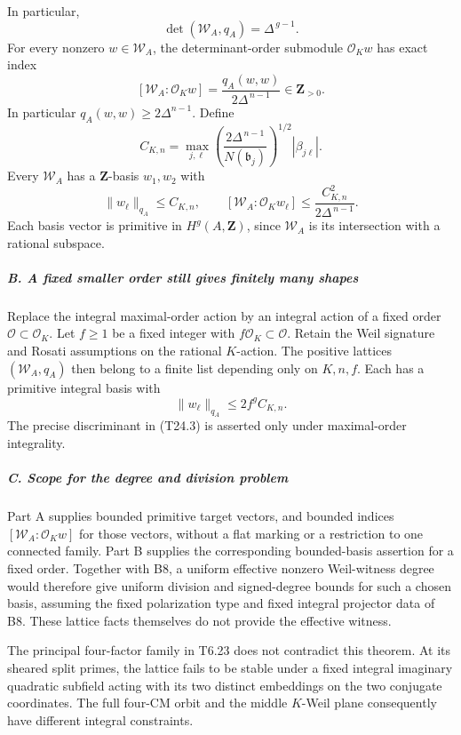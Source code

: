 In particular, \[
 \det(\mathscr W_A,q_A)=\Delta^{\,g-1}.
 \tag{T24.3}
\] For every nonzero \(w\in\mathscr W_A\), the determinant-order submodule \(\mathcal O_Kw\) has exact index \[
 [\mathscr W_A:\mathcal O_Kw]
       =\frac{q_A(w,w)}{2\Delta^{\,n-1}}\in\mathbf Z_{>0}.
 \tag{T24.4}
\] In particular \(q_A(w,w)\ge 2\Delta^{n-1}\). Define \[
 C_{K,n}
   =\max_{j,\ell}
       \left(\frac{2\Delta^{\,n-1}}{N(\mathfrak b_j)}\right)^{1/2}
                       |\beta_{j\ell}|.
 \tag{T24.5}
\] Every \(\mathscr W_A\) has a \(\mathbf Z\)-basis \(w_1,w_2\) with \[
 \|w_\ell\|_{q_A}\le C_{K,n},\qquad
 [\mathscr W_A:\mathcal O_Kw_\ell]
        \le \frac{C_{K,n}^2}{2\Delta^{\,n-1}}.
 \tag{T24.6}
\] Each basis vector is primitive in \(H^g(A,\mathbf Z)\), since \(\mathscr W_A\) is its intersection with a rational subspace.

\subparagraph{B. A fixed smaller order still gives finitely many shapes}\label{b.-a-fixed-smaller-order-still-gives-finitely-many-shapes}

Replace the integral maximal-order action by an integral action of a fixed order \(\mathcal O\subset\mathcal O_K\). Let \(f\ge1\) be a fixed integer with \(f\mathcal O_K\subset\mathcal O\). Retain the Weil signature and Rosati assumptions on the rational \(K\)-action. The positive lattices \((\mathscr W_A,q_A)\) then belong to a finite list depending only on \(K,n,f\). Each has a primitive integral basis with \[
 \|w_\ell\|_{q_A}\le 2f^g C_{K,n}.
 \tag{T24.7}
\] The precise discriminant in (T24.3) is asserted only under maximal-order integrality.

\subparagraph{C. Scope for the degree and division problem}\label{c.-scope-for-the-degree-and-division-problem}

Part A supplies bounded primitive target vectors, and bounded indices \([\mathscr W_A:\mathcal O_K w]\) for those vectors, without a flat marking or a restriction to one connected family. Part B supplies the corresponding bounded-basis assertion for a fixed order. Together with B8, a uniform effective nonzero Weil-witness degree would therefore give uniform division and signed-degree bounds for such a chosen basis, assuming the fixed polarization type and fixed integral projector data of B8. These lattice facts themselves do not provide the effective witness.

The principal four-factor family in T6.23 does not contradict this theorem. At its sheared split primes, the lattice fails to be stable under a fixed integral imaginary quadratic subfield acting with its two distinct embeddings on the two conjugate coordinates. The full four-CM orbit and the middle \(K\)-Weil plane consequently have different integral constraints.

